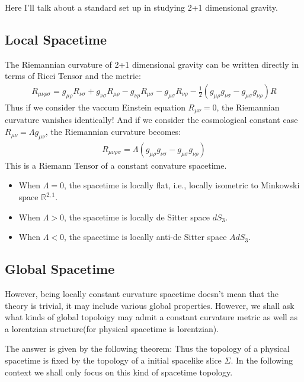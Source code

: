 Here I'll talk about a standard set up in studying 2+1 dimensional gravity. 

\subsection{Local Spacetime}

The Riemannian curvature of 2+1 dimensional gravity can be written directly in terms of Ricci Tensor and the metric:
\begin{align}
  R_{\mu\nu\rho\sigma}=g_{\mu\rho}R_{\nu\sigma}+g_{\nu\sigma}R_{\mu\rho}-g_{\nu\rho}R_{\mu\sigma}-g_{\mu\sigma}R_{\nu\rho}-\frac{1}{2}(g_{\mu\rho}g_{\nu\sigma}-g_{\mu\sigma}g_{\nu\rho})R
\end{align}
Thus if we consider the vaccum Einstein equation $R_{\mu\nu}=0$, the Riemannian curvature vanishes identically! And if we consider the cosmological constant case $R_{\mu\nu}=\Lambda g_{\mu\nu}$, the Riemannian curvature becomes:
\begin{align}
  R_{\mu\nu\rho\sigma}=\Lambda(g_{\mu\rho}g_{\nu\sigma}-g_{\mu\sigma}g_{\nu\rho})
\end{align}
This is a Riemann Tensor of a constant convature spacetime. 
\begin{itemize}
  \item When $\Lambda=0$, the spacetime is locally flat, i.e., locally isometric to Minkowski space $\mathbb{R}^{2,1}$.
  \item When $\Lambda>0$, the spacetime is locally de Sitter space $dS_3$.
  \item When $\Lambda<0$, the spacetime is locally anti-de Sitter space $AdS_3$.
\end{itemize}

\subsection{Global Spacetime}

However, being locally constant curvature spacetime doesn't mean that the theory is trivial, it may include various global properties. However, we shall ask what kinds of global topoloigy may admit a constant curvature metric as well as a lorentzian structure(for physical spacetime is lorentzian).

The answer is given by the following theorem:
Thus the topology of a physical spacetime is fixed by the topology of a initial spacelike slice $ \Sigma $. In the following context we shall only focus on this kind of spacetime topology.

